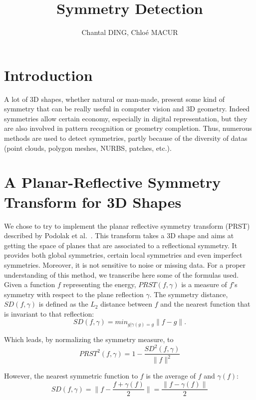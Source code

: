 \documentclass[10pt,a4paper]{article}			%
\title{Symmetry Detection}
\author{Chantal DING, Chloé MACUR}
\begin{document}


\newpage
\tableofcontents

\newpage
	
	\section*{Introduction}
  
	A lot of 3D shapes, whether natural or man-made, present some kind of symmetry that can be really useful in computer vision and 3D geometry.  Indeed symmetries allow certain economy, especially in digital representation, but they are also involved in pattern recognition or geometry completion. Thus, numerous methods are used to detect symmetries, partly because of the diversity of datas (point clouds, polygon meshes, NURBS, patches, etc.).  
 
	\section{A Planar-Reflective Symmetry Transform for 3D Shapes}
	
	We chose to try to implement the planar reflective symmetry transform (PRST) described by Podolak et al.~\cite{Podolak:2006:APS}. This transform takes a 3D shape and aims at getting the space of planes that are associated to a reflectional symmetry. It provides both global symmetries, certain local symmetries and even imperfect symmetries. Moreover, it is not sensitive to noise or missing data. For a proper understanding of this method, we transcribe here some of the formulas used.\\
	
	Given a function $f$ representing the energy, $PRST(f,\gamma)$ is a measure of $f$'s symmetry with respect to the plane reflection $\gamma$.
	The symmetry distance, $SD(f,\gamma)$ is defined as the $L_2$ distance between $f$ and the nearest function that is invariant to that reflection:
	\begin{displaymath}
	SD(f,\gamma) = min_{g|\gamma(g)=g} \lVert f-g \lVert . %
	\end{displaymath}

Which leads, by normalizing the symmetry measure, to
$$ PRST^2(f,\gamma) = 1 - \frac{SD^2(f,\gamma)}{\lVert f \lVert ^2}	 $$

However, the nearest symmetric function to $f$ is the average of $f$ and $\gamma(f)$:
$$ SD(f,\gamma) = \lVert f - \frac{f + \gamma(f)}{2} \lVert = \frac{\lVert f - \gamma(f) \lVert }{2} $$
\end{document}
